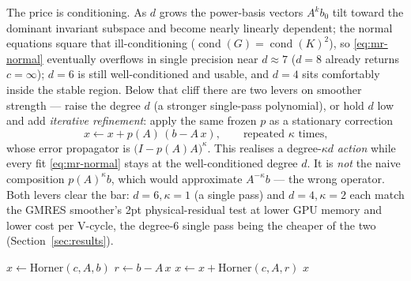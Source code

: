 \documentclass[12pt,a4paper]{article}
\newcommand{\Aop}{A}
\begin{document}
The price is conditioning. As $d$ grows the power-basis vectors $\Aop^k b_0$ tilt
toward the dominant invariant subspace and become nearly linearly dependent; the
normal equations square that ill-conditioning ($\operatorname{cond}(G)=
\operatorname{cond}(K)^2$), so \eqref{eq:mr-normal} eventually overflows in single
precision near $d\!\approx\!7$ ($d=8$ already returns $c=\infty$); $d=6$ is still
well-conditioned and usable, and $d=4$ sits comfortably inside the stable region.
Below that cliff there are two levers on smoother strength --- raise the degree $d$
(a stronger single-pass polynomial), or hold $d$ low and add \emph{iterative
refinement}: apply the same frozen $p$ as a stationary
correction
\begin{equation}
  x \gets x + p(\Aop)\,(b-\Aop\,x),\qquad \text{repeated } \kappa \text{ times,}
  \label{eq:mr-refine}
\end{equation}
whose error propagator is $\big(I-p(\Aop)\Aop\big)^{\kappa}$. This realises a
degree-$\kappa d$ \emph{action} while every fit \eqref{eq:mr-normal} stays at the
well-conditioned degree $d$. It is \emph{not} the naive composition
$p(\Aop)^{\kappa}b$, which would approximate $\Aop^{-\kappa}b$ --- the wrong
operator. Both levers clear the bar: $d{=}6,\kappa{=}1$ (a single pass) and
$d{=}4,\kappa{=}2$ each match the GMRES smoother's 2pt physical-residual test at
lower GPU memory and lower cost per V-cycle, the degree-$6$ single pass being the
cheaper of the two (Section~\ref{sec:results}).

\begin{algorithm}[H]
\caption{Frozen MR polynomial smoother $\mathrm{Poly}_{d,\kappa}(\Aop,b)$.
Coefficients $c$ from \eqref{eq:mr-normal} are precomputed once. Two PASS settings
(Section~\ref{sec:results}): $d{=}6,\kappa{=}1$ (memory-optimal, a single Horner
pass) and $d{=}4,\kappa{=}2$. $\kappa=1$ skips the refinement loop.}
\label{alg:poly}
\begin{algorithmic}[1]
\State $x \gets \mathrm{Horner}(c,\Aop,b)$ \Comment{$x=p(\Aop)b$ via \eqref{eq:horner}}
 
  \State $r \gets b - \Aop\,x$
  \State $x \gets x + \mathrm{Horner}(c,\Aop,r)$
\EndFor
\State \Return $x$
\end{algorithmic}
\end{algorithm}
\end{document}
